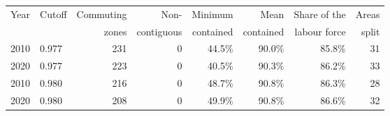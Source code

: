 \begin{tabular}{llrrrrrr}
\toprule
Year & Cutoff & Commuting & Non- & Minimum & Mean & Share of the & Areas \\& & zones & contiguous & contained & contained & labour force & split \\
\midrule
2010 & 0.977 & 231 & 0 & 44.5\% & 90.0\% & 85.8\% & 31 \\
2020 & 0.977 & 223 & 0 & 40.5\% & 90.3\% & 86.2\% & 33 \\
2010 & 0.980 & 216 & 0 & 48.7\% & 90.8\% & 86.3\% & 28 \\
2020 & 0.980 & 208 & 0 & 49.9\% & 90.8\% & 86.6\% & 32 \\
\bottomrule
\end{tabular}
